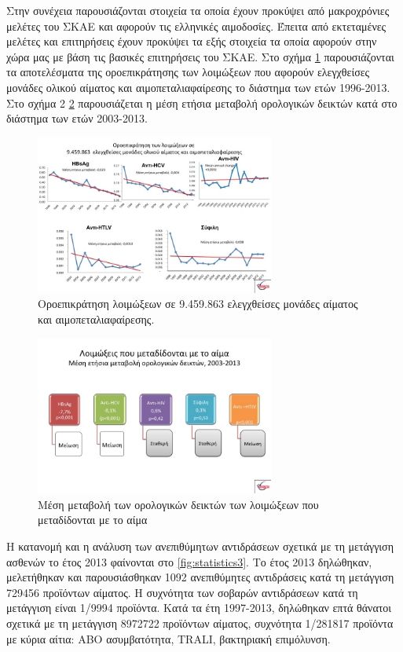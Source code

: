 	Στην συνέχεια παρουσιάζονται στοιχεία τα οποία έχουν προκύψει από μακροχρόνιες μελέτες του ΣΚΑΕ και αφορούν τις ελληνικές αιμοδοσίες. \cite{ΚΕ.ΕΛ.Π.ΝΟ.2015}
	Έπειτα από εκτεταμένες μελέτες και επιτηρήσεις έχουν προκύψει τα εξής στοιχεία τα οποία αφορούν στην χώρα μας με βάση τις βασικές επιτηρήσεις του ΣΚΑΕ. Στο σχήμα \ref{fig:statistics1}  παρουσιάζονται τα αποτελέσματα της οροεπικράτησης των λοιμώξεων που αφορούν ελεγχθείσες μονάδες ολικού αίματος και αιμοπεταλιαφαίρεσης το διάστημα των ετών 1996-2013. Στο σχήμα 2 \ref{fig:statistics2} παρουσιάζεται η μέση ετήσια μεταβολή ορολογικών δεικτών κατά στο διάστημα των ετών 2003-2013.
	\begin{figure}[h!]
	    \centering
	    \includegraphics[width=0.7\textwidth]{statistics1.jpg}
	    \caption{Οροεπικράτηση λοιμώξεων σε 9.459.863 ελεγχθείσες μονάδες αίματος και αιμοπεταλιαφαίρεσης.}
	    \label{fig:statistics1}
\end{figure}	
\begin{figure}[h!]
	    \centering
	    \includegraphics[width=0.7\textwidth]{statistics2.jpg}
	    \caption{Μέση μεταβολή των ορολογικών δεικτών των λοιμώξεων που μεταδίδονται με το αίμα}
	    \label{fig:statistics2}
\end{figure}	
	Η κατανομή και η ανάλυση των ανεπιθύμητων αντιδράσεων σχετικά με τη μετάγγιση ασθενών το έτος 2013 φαίνονται στο \ref{fig:statistics3}. Το έτος 2013 δηλώθηκαν, μελετήθηκαν και παρουσιάσθηκαν 1092 ανεπιθύμητες αντιδράσεις κατά τη μετάγγιση 729456 προϊόντων αίματος. Η συχνότητα των σοβαρών αντιδράσεων κατά τη μετάγγιση είναι 1/9994 προϊόντα. Κατά τα έτη 1997-2013, δηλώθηκαν επτά θάνατοι σχετικά με τη μετάγγιση 8972722 προϊόντων αίματος, συχνότητα 1/281817 προϊόντα με κύρια αίτια: ΑΒΟ ασυμβατότητα, TRALI, βακτηριακή επιμόλυνση.

